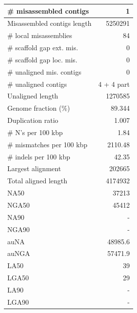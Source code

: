 \documentclass[12pt,a4paper]{article}
\begin{document}
\begin{table}[ht]
\begin{center}
\begin{tabular}{|l*{1}{|r}|}
\# misassembled contigs & 1 \\ \hline
Misassembled contigs length & 5250291 \\ \hline
\# local misassemblies & 84 \\ \hline
\# scaffold gap ext. mis. & 0 \\ \hline
\# scaffold gap loc. mis. & 0 \\ \hline
\# unaligned mis. contigs & 0 \\ \hline
\# unaligned contigs & 4 + 4 part \\ \hline
Unaligned length & 1270585 \\ \hline
Genome fraction (\%) & 89.344 \\ \hline
Duplication ratio & 1.007 \\ \hline
\# N's per 100 kbp & 1.84 \\ \hline
\# mismatches per 100 kbp & 2110.48 \\ \hline
\# indels per 100 kbp & 42.35 \\ \hline
Largest alignment & 202665 \\ \hline
Total aligned length & 4174932 \\ \hline
NA50 & 37213 \\ \hline
NGA50 & 45412 \\ \hline
NA90 & - \\ \hline
NGA90 & - \\ \hline
auNA & 48985.6 \\ \hline
auNGA & 57471.9 \\ \hline
LA50 & 39 \\ \hline
LGA50 & 29 \\ \hline
LA90 & - \\ \hline
LGA90 & - \\ \hline
\end{tabular}
\end{center}
\end{table}
\end{document}
